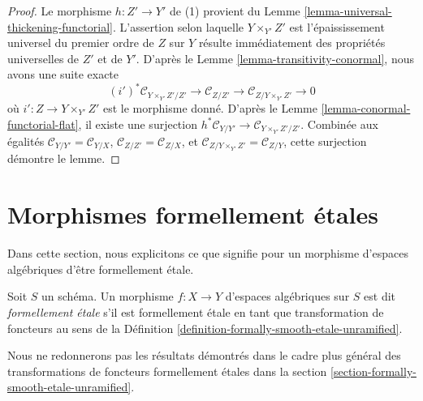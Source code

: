 \begin{proof}
Le morphisme $h : Z' \to Y'$ de (1) provient du
Lemme \ref{lemma-universal-thickening-functorial}.
L'assertion selon laquelle $Y \times_{Y'} Z'$ est l'épaississement universel du premier ordre
de $Z$ sur $Y$ résulte immédiatement des propriétés universelles
de $Z'$ et de $Y'$. D'après le
Lemme \ref{lemma-transitivity-conormal},
nous avons une suite exacte
$$
(i')^*\mathcal{C}_{Y \times_{Y'} Z'/Z'} \to
\mathcal{C}_{Z/Z'} \to
\mathcal{C}_{Z/Y \times_{Y'} Z'} \to 0
$$
où $i' : Z \to Y \times_{Y'} Z'$ est le morphisme donné. D'après le
Lemme \ref{lemma-conormal-functorial-flat},
il existe une surjection
$h^*\mathcal{C}_{Y/Y'} \to \mathcal{C}_{Y \times_{Y'} Z'/Z'}$.
Combinée aux égalités
$\mathcal{C}_{Y/Y'} = \mathcal{C}_{Y/X}$,
$\mathcal{C}_{Z/Z'} = \mathcal{C}_{Z/X}$, et
$\mathcal{C}_{Z/Y \times_{Y'} Z'} = \mathcal{C}_{Z/Y}$,
cette surjection démontre le lemme.
\end{proof}













\section{Morphismes formellement étales}
\label{section-formally-etale}

\noindent
Dans cette section, nous explicitons ce que signifie pour un morphisme d'espaces algébriques
d'être formellement étale.

\begin{definition}
\label{definition-formally-etale}
Soit $S$ un schéma. Un morphisme $f : X \to Y$ d'espaces algébriques sur $S$
est dit {\it formellement étale} s'il est formellement étale en tant que
transformation de foncteurs au sens de la
Définition \ref{definition-formally-smooth-etale-unramified}.
\end{definition}

\noindent
Nous ne redonnerons pas les résultats démontrés dans le cadre plus général des
transformations de foncteurs formellement étales dans la
section \ref{section-formally-smooth-etale-unramified}.

